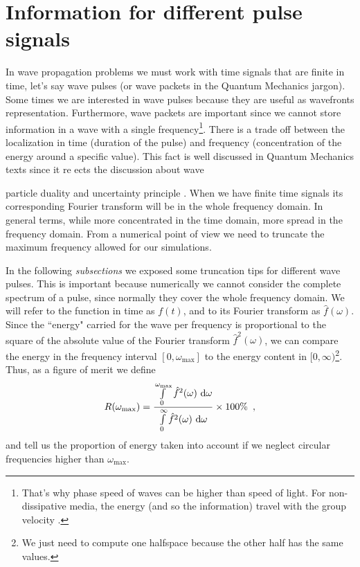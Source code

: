 \documentclass[12pt,letterpaper,landscape]{article}
\begin{document}
\section{Information for different pulse signals}
In wave propagation problems we must work with time signals that are finite in time, let's say wave pulses (or wave packets in the Quantum Mechanics jargon). Some times we are interested in wave pulses because they are useful as wavefronts representation. Furthermore, wave packets are important since we cannot store information in a wave with a single frequency\footnote{That's why phase speed of waves can be higher than speed of light. For non-dissipative media, the energy (and so the information) travel with the group velocity \cite{book:Brillouin1}.}. There is a trade off between the localization in time (duration of the pulse) and frequency (concentration of the energy around a specific value). This fact is well discussed in Quantum Mechanics texts since it re ects the discussion about wave{particle duality and uncertainty principle \cite{book:Zetilli}. When we have finite time signals its corresponding Fourier transform will be in the whole frequency domain. In general terms, while more concentrated in the time domain, more spread in the frequency domain. From a numerical point of view we need to truncate the maximum frequency allowed for our simulations.

In the following \emph{subsections} we exposed some truncation tips for different wave pulses. This is important because numerically we cannot consider the complete spectrum of a pulse, since normally they cover the whole frequency domain. We will refer to the function in time as $f(t)$, and to its Fourier transform as $\hat{f}(\omega)$. Since the ``energy" carried for the wave per frequency is proportional to the square of the absolute value of the Fourier transform $\hat{f}^2(\omega)$, we can compare the energy in the frequency interval $[0,\omega_{\max}]$ to the energy content in $[0,\infty)$\footnote{We just need to compute one halfspace because the other half has the same values.}. Thus, as a figure of merit we define
\begin{equation}
R(\omega_{\max}) = \frac{\int\limits_{0}^{\omega_{\max}} \hat{f}^2 (\omega)\ \rm{d}\omega}{\int\limits_{0}^{\infty} \hat{f}^2 (\omega)\ \rm{d}\omega}\times 100\% \enspace ,
\label{eq:trunc_energy}
\end{equation}
and tell us the proportion of energy taken into account if we neglect circular frequencies higher than $\omega_{\max}$.

}
\end{document}
